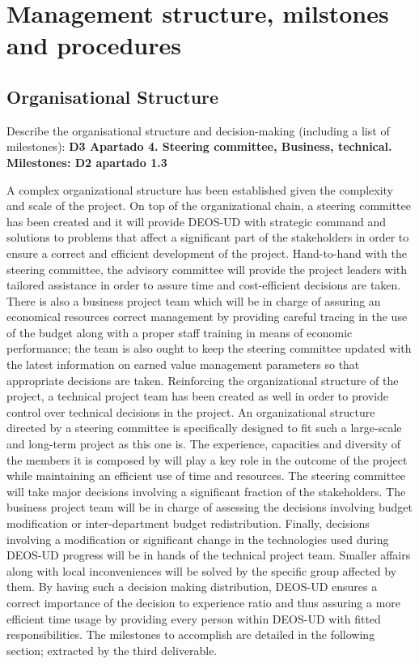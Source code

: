 \section{Management structure, milstones and procedures}

\subsection{Organisational Structure}

Describe the organisational structure and decision-making (including a list of milestones): \textbf{D3 Apartado 4. Steering committee, Business, technical. Milestones: D2 apartado 1.3}

A complex organizational structure has been established given the complexity and scale of the project. On top of the organizational chain, a steering committee has been created and it will provide DEOS-UD with strategic command and solutions to problems that affect a significant part of the stakeholders in order to ensure a correct and efficient development of the project. Hand-to-hand with the steering committee, the advisory committee will provide the project leaders with tailored assistance in order to assure time and cost-efficient decisions are taken. There is also a business project team which will be in charge of assuring an economical resources correct management by providing careful tracing in the use of the budget along with a proper staff training in means of economic performance; the team is also ought to keep the steering committee updated with the latest information on earned value management parameters so that appropriate decisions are taken. Reinforcing the organizational structure of the project, a technical project team has been created as well in order to provide control over technical decisions in the project.
An organizational structure directed by a steering committee is specifically designed to fit such a large-scale and long-term project as this one is. The experience, capacities and diversity of the members it is composed by will play a key role in the outcome of the project while maintaining an efficient use of time and resources. The steering committee will take major decisions involving a significant fraction of the stakeholders. The business project team will be in charge of assessing the decisions involving budget modification or inter-department budget redistribution. Finally, decisions involving a modification or significant change in the technologies used during DEOS-UD progress will be in hands of the technical project team. Smaller affairs along with local inconveniences will be solved by the specific group affected by them. By having such a decision making distribution, DEOS-UD ensures a correct importance of the decision to experience ratio and thus assuring a more efficient time usage by providing every person within DEOS-UD with fitted responsibilities.
The milestones to accomplish are detailed in the following section; extracted by the third deliverable.     

